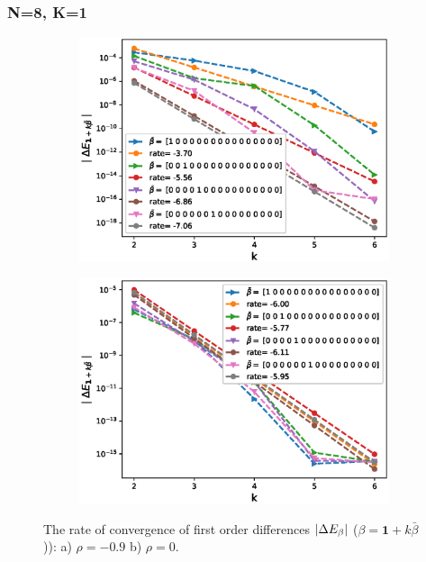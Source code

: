 \documentclass[11pt]{article}
\begin{document}
\newpage
\subsubsection*{N=8, K=1 }


\begin{figure}[h!]
\centering
\begin{subfigure}{.5\textwidth}
\centering
\includegraphics[width=1\linewidth]{./figures/effect_rho_differences/H_0_43_K_1/N_8/first_difference_rbergomi_8steps_H_043_K_1_rho__0_9_with_rate_W1.eps}
\caption{}
\label{fig:sub3}
\end{subfigure}%
\begin{subfigure}{.5\textwidth}
\centering
\includegraphics[width=1\linewidth]{./figures/effect_rho_differences/H_0_43_K_1/N_8/first_difference_rbergomi_8steps_H_043_K_1_rho_0_with_rate_W1.eps}
\caption{}
\label{fig:sub4}
\end{subfigure}

\caption{The rate of convergence of  first order differences $\left\lvert\Delta E_{\beta}\right\rvert$ ($\beta=\mathbf{1}+k \bar{\beta}$)): a) $\rho=-0.9$ b)  $\rho=0.$}
\label{fig:test2}
\end{figure}
\end{document}
